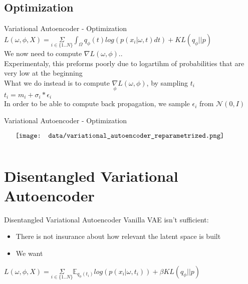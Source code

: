 \documentclass{beamer}
\begin{document}
\subsection{Optimization}
\begin{frame}{Variational Autoencoder - Optimization}
        $ L(\omega, \phi, X)= \underset{i \in \{1..N\}}{\Sigma} \int_\Omega q_\phi(t) log( p(x_i | \omega, t) dt) + KL( q_\phi || p ) $\\
	We now need to compute $\nabla L(\omega, \phi).$.\\
	Experimentaly, this preforms poorly due to logartihm of probabilities that are very low at the beginning\\
	What we do instead is to compute $\underset{\phi}{\nabla} L(\omega,\phi)$, by sampling $t_i$ \\
	$t_i = m_i + \sigma_i * \epsilon_i$ \\
	In order to be able to compute back propagation, we sample $\epsilon_i$ from  $\mathcal{N}(0,I)$
\end{frame}

\begin{frame}{Variational Autoencoder - Optimization}
    \begin{minipage}{6in}
    \centering
    $\vcenter{
    \texttt{[image: data/variational\_autoencoder\_reparametrized.png]} \\
    }$
    \end{minipage}
\end{frame}

\section{Disentangled Variational Autoencoder}
\begin{frame}{Disentangled Variational Autoencoder}
	Vanilla VAE isn't sufficient:
	\begin{itemize}
		\item There is not insurance about how relevant the latent space is built  
		\item We want  
	\end{itemize}
	$ L(\omega, \phi, X)= \underset{i \in \{1..N\}}{\Sigma} \mathbb{E}_{q_\phi(t_i)} log( p(x_i | \omega, t_i)) + \beta KL( q_\phi || p ) $
\end{frame}

\end{document}
